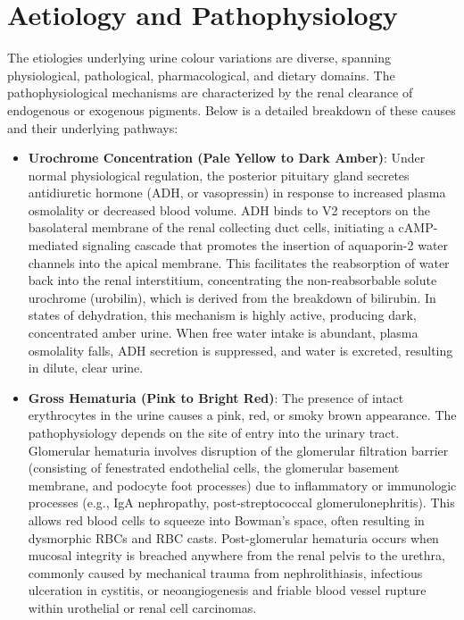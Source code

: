 \section{Aetiology and Pathophysiology}
The etiologies underlying urine colour variations are diverse, spanning physiological, pathological, pharmacological, and dietary domains. The pathophysiological mechanisms are characterized by the renal clearance of endogenous or exogenous pigments. Below is a detailed breakdown of these causes and their underlying pathways:

\begin{itemize}
  \item \textbf{Urochrome Concentration (Pale Yellow to Dark Amber)}: Under normal physiological regulation, the posterior pituitary gland secretes antidiuretic hormone (ADH, or vasopressin) in response to increased plasma osmolality or decreased blood volume. ADH binds to V2 receptors on the basolateral membrane of the renal collecting duct cells, initiating a cAMP-mediated signaling cascade that promotes the insertion of aquaporin-2 water channels into the apical membrane. This facilitates the reabsorption of water back into the renal interstitium, concentrating the non-reabsorbable solute urochrome (urobilin), which is derived from the breakdown of bilirubin. In states of dehydration, this mechanism is highly active, producing dark, concentrated amber urine. When free water intake is abundant, plasma osmolality falls, ADH secretion is suppressed, and water is excreted, resulting in dilute, clear urine.

  \item \textbf{Gross Hematuria (Pink to Bright Red)}: The presence of intact erythrocytes in the urine causes a pink, red, or smoky brown appearance. The pathophysiology depends on the site of entry into the urinary tract. Glomerular hematuria involves disruption of the glomerular filtration barrier (consisting of fenestrated endothelial cells, the glomerular basement membrane, and podocyte foot processes) due to inflammatory or immunologic processes (e.g., IgA nephropathy, post-streptococcal glomerulonephritis). This allows red blood cells to squeeze into Bowman's space, often resulting in dysmorphic RBCs and RBC casts. Post-glomerular hematuria occurs when mucosal integrity is breached anywhere from the renal pelvis to the urethra, commonly caused by mechanical trauma from nephrolithiasis, infectious ulceration in cystitis, or neoangiogenesis and friable blood vessel rupture within urothelial or renal cell carcinomas.


\end{itemize}
